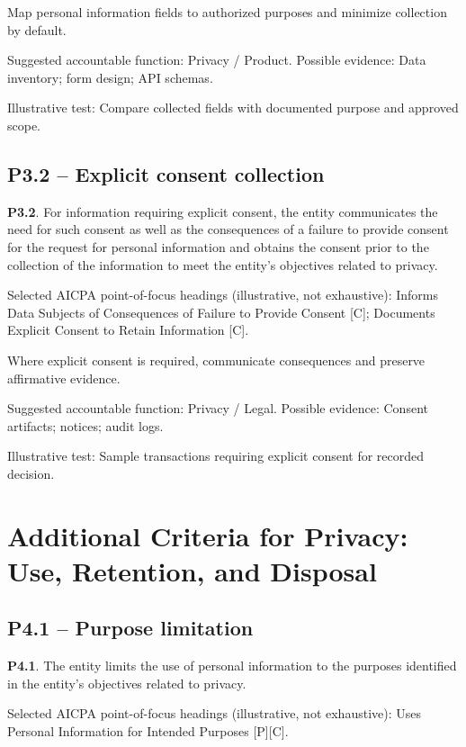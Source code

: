 \documentclass[10pt,oneside]{report}
\begin{document}
\begin{engineeringbox}
Map personal information fields to authorized purposes and minimize collection by default.
\end{engineeringbox}
Suggested accountable function: Privacy / Product. Possible evidence: Data inventory; form design; API schemas.

Illustrative test: Compare collected fields with documented purpose and approved scope.

\subsection*{P3.2 -- Explicit consent collection}
\begin{aicpabox}
\textbf{P3.2}. For information requiring explicit consent, the entity communicates the need for such consent as well as the consequences of a failure to provide consent for the request for personal information and obtains the consent prior to the collection of the information to meet the entity's objectives related to privacy.\par{}
\end{aicpabox}
Selected AICPA point-of-focus headings (illustrative, not exhaustive): Informs Data Subjects of Consequences of Failure to Provide Consent [C]; Documents Explicit Consent to Retain Information [C].

\begin{engineeringbox}
Where explicit consent is required, communicate consequences and preserve affirmative evidence.
\end{engineeringbox}
Suggested accountable function: Privacy / Legal. Possible evidence: Consent artifacts; notices; audit logs.

Illustrative test: Sample transactions requiring explicit consent for recorded decision.

\section{Additional Criteria for Privacy: Use, Retention, and Disposal}
\subsection*{P4.1 -- Purpose limitation}
\begin{aicpabox}
\textbf{P4.1}. The entity limits the use of personal information to the purposes identified in the entity's objectives related to privacy.\par{}
\end{aicpabox}
Selected AICPA point-of-focus headings (illustrative, not exhaustive): Uses Personal Information for Intended Purposes [P][C].
\end{document}
